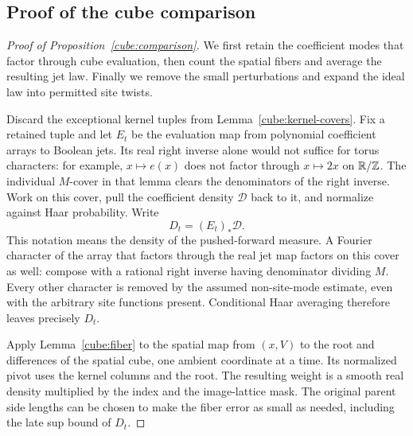 \subsection{Proof of the cube comparison}

\begin{proof}[Proof of Proposition~\ref{cube:comparison}]
We first retain the coefficient modes that factor through cube evaluation,
then count the spatial fibers and average the resulting jet law.
Finally we remove the small perturbations and expand the ideal law
into permitted site twists.

Discard the exceptional kernel tuples from
Lemma~\ref{cube:kernel-covers}. Fix a retained tuple and let $E_t$
be the evaluation map from polynomial coefficient arrays to Boolean
jets. Its real right inverse alone would not suffice for torus
characters: for example, $x\mapsto e(x)$ does not factor through
$x\mapsto2x$ on $\mathbb R/\mathbb Z$. The individual $M$-cover in that lemma
clears the denominators of the right inverse. Work on this cover,
pull the coefficient density $\mathcal D$ back to it, and normalize
against Haar probability. Write
\[
                       D_t=(E_t)_*\mathcal D.
\]
This notation means the density of the pushed-forward measure.
A Fourier character of the array that factors through the real jet
map factors on this cover as well: compose with a rational right
inverse having denominator dividing $M$.  Every other character is
removed by the assumed non-site-mode estimate, even with the
arbitrary site functions present.  Conditional Haar averaging
therefore leaves precisely $D_t$.

Apply Lemma~\ref{cube:fiber} to the spatial map from $(x,V)$ to the
root and differences of the spatial cube, one ambient coordinate at
a time.  Its normalized pivot uses the kernel columns and the root.
The resulting weight is a smooth real density multiplied by the
index and the image-lattice mask.  The original parent side lengths
can be chosen to make the fiber error as small as needed, including
the late sup bound of $D_t$.


\end{proof}
